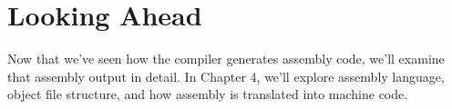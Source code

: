\section{Looking Ahead}

Now that we've seen how the compiler generates assembly code, we'll examine that assembly output in detail. In Chapter 4, we'll explore assembly language, object file structure, and how assembly is translated into machine code.
